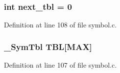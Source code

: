\subsubsection{\setlength{\rightskip}{0pt plus 5cm}int \bf{next\_\-tbl} = 0\hspace{0.3cm}{\tt  [static]}}\label{symbol_8c_8f6d5fcc8b0f003fcb0ac869a190bc2f}




Definition at line 108 of file symbol.c.
\subsubsection{\setlength{\rightskip}{0pt plus 5cm}\bf{\_\-Sym\-Tbl} \bf{TBL}[MAX]\hspace{0.3cm}{\tt  [static]}}\label{symbol_8c_084986a159410bcb790168f3471ee5e1}




Definition at line 107 of file symbol.c.